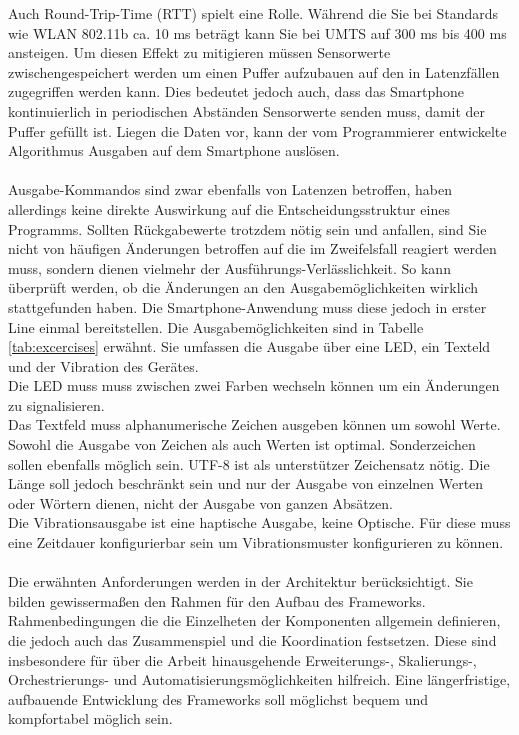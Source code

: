\documentclass[11pt,a4paper]{report}
\begin{document}
Auch Round-Trip-Time (RTT) spielt eine Rolle.
Während die Sie bei Standards wie WLAN 802.11b ca. 10 ms beträgt kann Sie bei UMTS auf 300 ms bis 400 ms ansteigen.\cite{network_latencies}
Um diesen Effekt zu mitigieren müssen Sensorwerte zwischengespeichert werden um einen Puffer aufzubauen auf den in Latenzfällen zugegriffen werden kann.
Dies bedeutet jedoch auch, dass das Smartphone kontinuierlich in periodischen Abständen Sensorwerte senden muss, damit der Puffer gefüllt ist.
Liegen die Daten vor, kann der vom Programmierer entwickelte Algorithmus Ausgaben auf dem Smartphone auslösen.
\\\\
Ausgabe-Kommandos sind zwar ebenfalls von Latenzen betroffen, haben allerdings keine direkte Auswirkung auf die Entscheidungsstruktur eines Programms.
Sollten Rückgabewerte trotzdem nötig sein und anfallen, sind Sie nicht von häufigen Änderungen betroffen auf die im Zweifelsfall reagiert werden muss, sondern dienen vielmehr der Ausführungs-Verlässlichkeit.
So kann überprüft werden, ob die Änderungen an den Ausgabemöglichkeiten wirklich stattgefunden haben.
Die Smartphone-Anwendung muss diese jedoch in erster Line einmal bereitstellen.
Die Ausgabemöglichkeiten sind in Tabelle \ref{tab:excercises} erwähnt.
Sie umfassen die Ausgabe über eine LED, ein Texteld und der Vibration des Gerätes.
\\
Die LED muss muss zwischen zwei Farben wechseln können um ein Änderungen zu signalisieren.
\\
Das Textfeld muss alphanumerische Zeichen ausgeben können um sowohl Werte.
Sowohl die Ausgabe von Zeichen als auch Werten ist optimal.
Sonderzeichen sollen ebenfalls möglich sein.
UTF-8 ist als unterstützer Zeichensatz nötig.
Die Länge soll jedoch beschränkt sein und nur der Ausgabe von einzelnen Werten oder Wörtern dienen, nicht der Ausgabe von ganzen Absätzen.
\\
Die Vibrationsausgabe ist eine haptische Ausgabe, keine Optische.
Für diese muss eine Zeitdauer konfigurierbar sein um Vibrationsmuster konfigurieren zu können.
\\\\
Die erwähnten Anforderungen werden in der Architektur berücksichtigt.
Sie bilden gewissermaßen den Rahmen für den Aufbau des Frameworks.
Rahmenbedingungen die die Einzelheten der Komponenten allgemein definieren, die jedoch auch das Zusammenspiel und die Koordination festsetzen.
Diese sind insbesondere für über die Arbeit hinausgehende Erweiterungs-, Skalierungs-, Orchestrierungs- und Automatisierungsmöglichkeiten hilfreich.
Eine längerfristige, aufbauende Entwicklung des Frameworks soll möglichst bequem und kompfortabel möglich sein.
\end{document}
